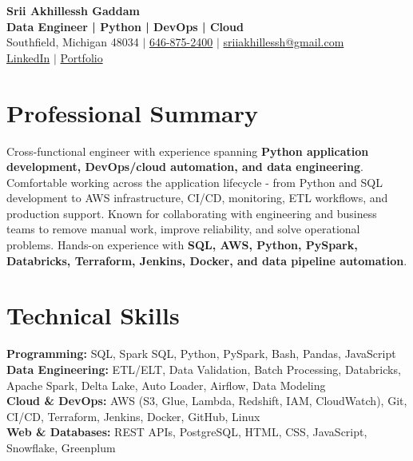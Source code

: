 \documentclass[letterpaper,10pt]{article}
\begin{document}
\fontsize{9.35pt}{10.45pt}\selectfont

\begin{center}
    {\LARGE \textbf{Srii Akhillessh Gaddam}} \\[-1pt]
    \textbf{Data Engineer | Python | DevOps | Cloud} \\[2pt]
    Southfield, Michigan 48034 $|$
    \href{tel:6468752400}{646-875-2400} $|$
    \href{mailto:sriiakhillessh@gmail.com}{sriiakhillessh@gmail.com} \\[1pt]
    \href{https://www.linkedin.com/in/srii-akhiilessh-gaddam-b48668191/}{LinkedIn} $|$
    \href{https://sriiakhillesshg.github.io/portfolio/}{Portfolio}
\end{center}
\vspace{-8pt}

\section{Professional Summary}
\small{Cross-functional engineer with experience spanning \textbf{Python application development, DevOps/cloud automation, and data engineering}. Comfortable working across the application lifecycle - from Python and SQL development to AWS infrastructure, CI/CD, monitoring, ETL workflows, and production support. Known for collaborating with engineering and business teams to remove manual work, improve reliability, and solve operational problems. Hands-on experience with \textbf{SQL, AWS, Python, PySpark, Databricks, Terraform, Jenkins, Docker, and data pipeline automation}.}

\section{Technical Skills}
\small{
\textbf{Programming:} SQL, Spark SQL, Python, PySpark, Bash, Pandas, JavaScript \\
\textbf{Data Engineering:} ETL/ELT, Data Validation, Batch Processing, Databricks, Apache Spark, Delta Lake, Auto Loader, Airflow, Data Modeling \\
\textbf{Cloud \& DevOps:} AWS (S3, Glue, Lambda, Redshift, IAM, CloudWatch), Git, CI/CD, Terraform, Jenkins, Docker, GitHub, Linux \\
\textbf{Web \& Databases:} REST APIs, PostgreSQL, HTML, CSS, JavaScript, Snowflake, Greenplum
}
\end{document}
